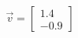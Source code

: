 \documentclass[preview]{standalone}
\begin{document}
\begin{align*}
\vec{v}=\begin{bmatrix}1.4\\-0.9\end{bmatrix}
\end{align*}
\end{document}
